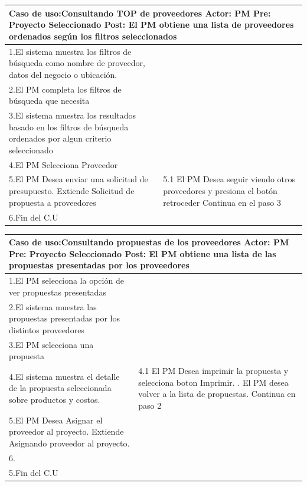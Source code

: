 \begin{longtable}{|p{}|p{}|}
    \hline
    \multicolumn{2}{|p{16cm}|}{
        \textbf{Caso de uso:}Consultando TOP de proveedores\newline
        \textbf{Actor:} PM\newline
        \textbf{Pre: }Proyecto Seleccionado\newline
        \textbf{Post:} El PM obtiene una lista de proveedores ordenados según los filtros seleccionados
    }\\
    \hline
    1.El sistema muestra los filtros de búsqueda como nombre de proveedor, datos del negocio o ubicación. & \\
    \hline
    2.El PM completa los filtros de búsqueda que necesita&  \\
    \hline
    3.El sistema muestra los resultados basado en los filtros de búsqueda ordenados por algun criterio seleccionado& \\
    \hline
    4.El PM Selecciona Proveedor &\\
    \hline
    5.El PM Desea enviar una solicitud de presupuesto. Extiende Solicitud de propuesta a proveedores &5.1 El PM Desea seguir viendo otros proveedores y presiona el botón retroceder \newline 5.2 Continua en el paso 3\\
    \hline
    6.Fin del C.U&\\
    \hline
\end{longtable}


\begin{longtable}{|p{}|p{}|}
    \hline
    \multicolumn{2}{|p{16cm}|}{
        \textbf{Caso de uso:}Consultando propuestas de los proveedores\newline
        \textbf{Actor:} PM\newline
        \textbf{Pre: }Proyecto Seleccionado\newline
        \textbf{Post:} El PM obtiene una lista de las propuestas presentadas por los proveedores
    }\\
    \hline
    1.El PM selecciona la opción de ver propuestas presentadas&\\
    \hline
    2.El sistema muestra las propuestas presentadas por los distintos proveedores & \\
    \hline
    3.El PM selecciona una propuesta  &\\
    \hline
    4.El sistema muestra el detalle de la propuesta seleccionada sobre productos y costos.&4.1 El PM Desea imprimir la propuesta y selecciona boton Imprimir. \newline 4.2. El PM desea volver a la lista de propuestas. Continua en paso 2\\
    \hline
    5.El PM Desea Asignar el proveedor al proyecto. Extiende Asignando proveedor al proyecto.&\\
    \hline
    6.&\\
    \hline
    5.Fin del C.U&\\
    \hline
\end{longtable}

